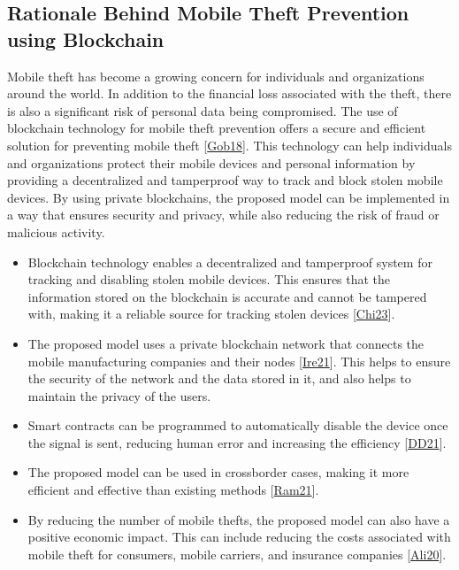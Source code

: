 \documentclass[letterpaper,10pt,english]{jupyterBook}
\begin{document}
\subsection{Rationale Behind Mobile Theft Prevention using Blockchain}
\label{\detokenize{MTP/mtp:rationale-behind-mobile-theft-prevention-using-blockchain}}
\sphinxAtStartPar
Mobile theft has become a growing concern for individuals and organizations around the world. In addition to the financial loss associated with the theft, there is also a significant risk of personal data being compromised. The use of blockchain technology for mobile theft prevention offers a secure and efficient solution for preventing mobile theft {[}\hyperlink{cite.MTP/mtp:id19}{Gob18}{]}. This technology can help individuals and organizations protect their mobile devices and personal information by providing a decentralized and tamper\sphinxhyphen{}proof way to track and block stolen mobile devices. By using private blockchains, the proposed model can be implemented in a way that ensures security and privacy, while also reducing the risk of fraud or malicious activity.
\begin{itemize}
\item {} 
\sphinxAtStartPar
{} Blockchain technology enables a decentralized and tamper\sphinxhyphen{}proof system for tracking and disabling stolen mobile devices. This ensures that the information stored on the blockchain is accurate and cannot be tampered with, making it a reliable source for tracking stolen devices {[}\hyperlink{cite.MTP/mtp:id20}{Chi23}{]}.

\item {} 
\sphinxAtStartPar
{} The proposed model uses a private blockchain network that connects the mobile manufacturing companies and their nodes {[}\hyperlink{cite.MTP/mtp:id21}{Ire21}{]}. This helps to ensure the security of the network and the data stored in it, and also helps to maintain the privacy of the users.

\item {} 
\sphinxAtStartPar
{} Smart contracts can be programmed to automatically disable the device once the signal is sent, reducing human error and increasing the efficiency {[}\hyperlink{cite.MTP/mtp:id22}{DD21}{]}.

\item {} 
\sphinxAtStartPar
{} The proposed model can be used in cross\sphinxhyphen{}border cases, making it more efficient and effective than existing methods {[}\hyperlink{cite.MTP/mtp:id23}{Ram21}{]}.

\item {} 
\sphinxAtStartPar
{} By reducing the number of mobile thefts, the proposed model can also have a positive economic impact. This can include reducing the costs associated with mobile theft for consumers, mobile carriers, and insurance companies {[}\hyperlink{cite.MTP/mtp:id24}{Ali20}{]}.

\end{itemize}
\end{document}
